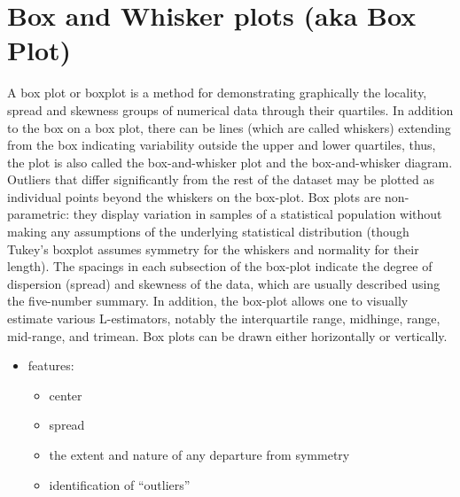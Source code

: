 \section{Box and Whisker plots (aka Box Plot)}\label{Box plots}
A box plot or boxplot is a method for demonstrating graphically the locality, spread and skewness groups of numerical data through their quartiles. In addition to the box on a box plot, there can be lines (which are called whiskers) extending from the box indicating variability outside the upper and lower quartiles, thus, the plot is also called the box-and-whisker plot and the box-and-whisker diagram. Outliers that differ significantly from the rest of the dataset may be plotted as individual points beyond the whiskers on the box-plot. Box plots are non-parametric: they display variation in samples of a statistical population without making any assumptions of the underlying statistical distribution (though Tukey's boxplot assumes symmetry for the whiskers and normality for their length). The spacings in each subsection of the box-plot indicate the degree of dispersion (spread) and skewness of the data, which are usually described using the five-number summary. In addition, the box-plot allows one to visually estimate various L-estimators, notably the interquartile range, midhinge, range, mid-range, and trimean. Box plots can be drawn either horizontally or vertically.

\begin{itemize}
    \item features:
    \begin{itemize}
        \item center
        \item spread
        \item the extent and nature of any departure from symmetry
        \item identification of “outliers”
    \end{itemize}
\end{itemize}

